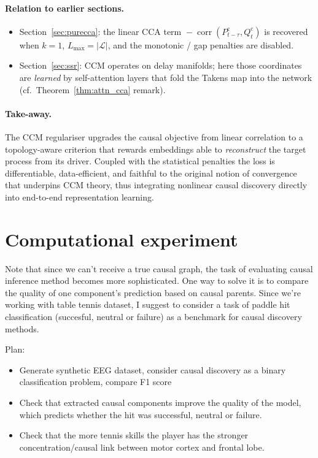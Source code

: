 \documentclass[14pt]{extarticle}
\begin{document}
	\paragraph{Relation to earlier sections.}
	\begin{itemize}[leftmargin=1.4em,itemsep=0.1em]
		\item Section~\ref{sec:purecca}: the linear CCA term
		$\!-\!\operatorname{corr}(P^{\mathrm c}_{t-\tau},Q^{\mathrm c}_t)$
		is recovered when $k=1$, $L_{\max}=|\mathcal L|$, and the
		monotonic / gap penalties are disabled.
		\item Section~\ref{sec:ssr}: CCM operates on delay manifolds; here those
		coordinates are \emph{learned} by self-attention layers
		that fold the Takens map into the network
		(cf.\ Theorem~\ref{thm:attn_cca} remark).
	\end{itemize}
	
	\paragraph{Take-away.}
	The CCM regulariser upgrades the causal objective from linear
	correlation to a topology-aware criterion that rewards embeddings able
	to \emph{reconstruct} the target process from its driver.
	Coupled with the statistical penalties the loss is differentiable,
	data-efficient, and faithful to the original notion of convergence that
	underpins CCM theory, thus integrating nonlinear causal discovery
	directly into end-to-end representation learning.
	
	\section{Computational experiment} \label{sec:experiments}
	Note that since we can't receive a true causal graph, the task of evaluating causal inference method becomes more sophisticated.
	One way to solve it is to compare the quality of one component's prediction based on causal parents.
	Since we're working with table tennis dataset, I suggest to consider a task of paddle hit classification (succesful, neutral or failure) as a benchmark for causal discovery methods.
	
	Plan:
	\begin{itemize}
		\item Generate synthetic EEG dataset, consider causal discovery as a binary classification problem, compare F1 score
		\item Check that extracted causal components improve the quality of the model, which predicts whether the hit was successful, neutral or failure.
		\item Check that the more tennis skills the player has the stronger concentration/causal link between motor cortex and frontal lobe.
	\end{itemize}
	
\end{document}

